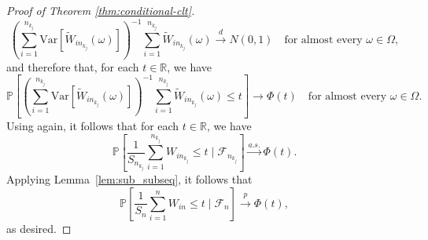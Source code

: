 \documentclass[12pt]{article}
\theoremstyle{definition}
\theoremstyle{remark}
\newcommand{\V}{\mathrm{Var}}							%
\newcommand{\R}{\mathbb{R}}								%
\newcommand{\convp}{\overset p \rightarrow}             %
\newcommand{\convd}{\overset d \rightarrow}             %
\newcommand{\convas}{\overset {a.s.} \rightarrow}       %
\begin{document}
\begin{proof}[Proof of Theorem \ref{thm:conditional-clt}]
		\begin{equation}
			\left(\sum_{i = 1}^{n_{k_j}} \V[\widetilde W_{in_{k_j}}(\omega)]\right)^{-1}\sum_{i = 1}^{n_{k_j}} \widetilde W_{in_{k_j}}(\omega) \convd N(0,1) \quad \text{for almost every } \omega \in \Omega,
		\end{equation}
		and therefore that, for each $t \in \R$, we have 
		\begin{equation}
			\mathbb P\left[\left(\sum_{i = 1}^{n_{k_j}} \V[\widetilde W_{in_{k_j}}(\omega)]\right)^{-1}\sum_{i = 1}^{n_{k_j}} \widetilde W_{in_{k_j}}(\omega) \leq t\right] \rightarrow \Phi(t) \quad \text{for almost every } \omega \in \Omega.
		\end{equation}
		Using \citet[Theorem 8.38]{Lista2017} again, it follows that for each $t \in \R$, we have
		\begin{equation}
			\mathbb P\left[\frac{1}{S_{n_{k_j}}}\sum_{i = 1}^{n_{k_j}} W_{in_{k_j}} \leq t \mid \mathcal F_{n_{k_j}}\right] \convas \Phi(t).
		\end{equation}
		Applying Lemma~\ref{lem:sub_subseq}, it follows that
		\begin{equation}
			\mathbb P\left[\frac{1}{S_{n}}\sum_{i = 1}^{n} W_{in} \leq t \mid \mathcal F_{n}\right] \convp \Phi(t),
		\end{equation}
		as desired.
	\end{proof}
	
\end{document}
